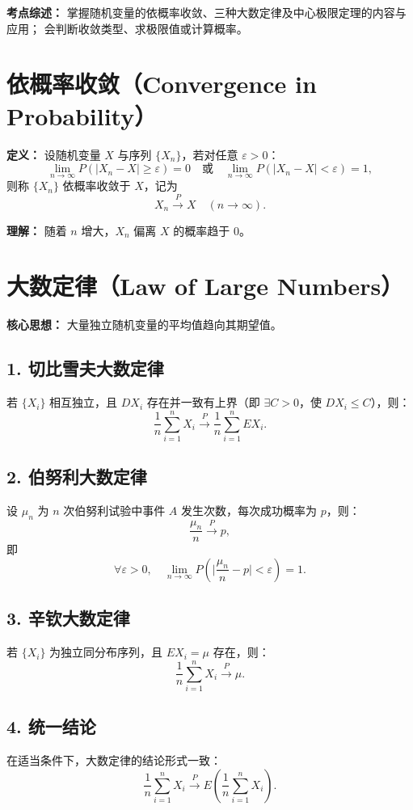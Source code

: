 
\textbf{考点综述：}
掌握随机变量的依概率收敛、三种大数定律及中心极限定理的内容与应用；
会判断收敛类型、求极限值或计算概率。


\section{依概率收敛（Convergence in Probability）}

\textbf{定义：}
设随机变量 $X$ 与序列 $\{X_n\}$，若对任意 $\varepsilon>0$：
$$
      \lim_{n\to\infty}P(|X_n-X|\ge\varepsilon)=0
      \quad\text{或}\quad
      \lim_{n\to\infty}P(|X_n-X|<\varepsilon)=1,
$$
则称 $\{X_n\}$ 依概率收敛于 $X$，记为
$$
      X_n\xrightarrow{P}X\quad(n\to\infty).
$$

\textbf{理解：} 随着 $n$ 增大，$X_n$ 偏离 $X$ 的概率趋于 0。


\section{大数定律（Law of Large Numbers）}

\textbf{核心思想：}
大量独立随机变量的平均值趋向其期望值。

\subsection*{1. 切比雪夫大数定律}
若 $\{X_i\}$ 相互独立，且 $DX_i$ 存在并一致有上界（即 $\exists C>0$，使 $DX_i\le C$），则：
$$
      \frac1n\sum_{i=1}^{n}X_i\xrightarrow{P}\frac1n\sum_{i=1}^{n}EX_i.
$$

\subsection*{2. 伯努利大数定律}
设 $\mu_n$ 为 $n$ 次伯努利试验中事件 $A$ 发生次数，每次成功概率为 $p$，则：
$$
      \frac{\mu_n}{n}\xrightarrow{P}p,
$$
即
$$
      \forall \varepsilon>0,\quad
      \lim_{n\to\infty}P\left(\Big|\frac{\mu_n}{n}-p\Big|<\varepsilon\right)=1.
$$

\subsection*{3. 辛钦大数定律}
若 $\{X_i\}$ 为独立同分布序列，且 $E X_i=\mu$ 存在，则：
$$
      \frac1n\sum_{i=1}^{n}X_i\xrightarrow{P}\mu.
$$

\subsection*{4. 统一结论}
在适当条件下，大数定律的结论形式一致：
$$
      \frac1n\sum_{i=1}^{n}X_i\xrightarrow{P}E\!\left(\frac1n\sum_{i=1}^{n}X_i\right).
$$

